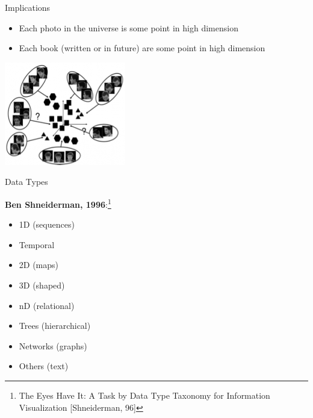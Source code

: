 \documentclass{beamer}
\begin{document}
\begin{frame}{Implications}
    \begin{itemize}
        \item Each photo in the universe is some point in high dimension
        \item Each book (written or in future) are some point in high dimension
    \end{itemize}
    \begin{center}                                                                                                           
        \includegraphics[scale=0.8]{faceData.png}                                                                    
    \end{center}                                                                                                             
\end{frame}   


\begin{frame}{Data Types} 

    {\bf Ben Shneiderman, 1996}:\footnote{The Eyes Have It: A Task by Data Type Taxonomy for Information Visualization [Shneiderman, 96]}
    \begin{itemize}
        \item 1D (sequences)
        \item Temporal
        \item 2D (maps)
        \item 3D (shaped)
        \item nD (relational)
        \item Trees (hierarchical)
        \item Networks (graphs)
        \item Others (text)
    \end{itemize}
\end{frame}  
\end{document}
